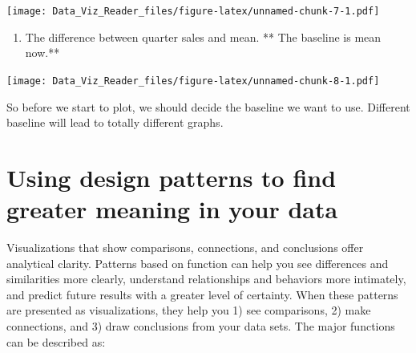 \documentclass[]{book}
\newenvironment{Shaded}{\begin{snugshade}}{\end{snugshade}}
\newcommand{\KeywordTok}[1]{\textcolor[rgb]{0.13,0.29,0.53}{\textbf{#1}}}
\newcommand{\DataTypeTok}[1]{\textcolor[rgb]{0.13,0.29,0.53}{#1}}
\newcommand{\DecValTok}[1]{\textcolor[rgb]{0.00,0.00,0.81}{#1}}
\newcommand{\StringTok}[1]{\textcolor[rgb]{0.31,0.60,0.02}{#1}}
\newcommand{\CommentTok}[1]{\textcolor[rgb]{0.56,0.35,0.01}{\textit{#1}}}
\newcommand{\OtherTok}[1]{\textcolor[rgb]{0.56,0.35,0.01}{#1}}
\newcommand{\ControlFlowTok}[1]{\textcolor[rgb]{0.13,0.29,0.53}{\textbf{#1}}}
\newcommand{\OperatorTok}[1]{\textcolor[rgb]{0.81,0.36,0.00}{\textbf{#1}}}
\newcommand{\NormalTok}[1]{#1}
\providecommand{\tightlist}{%
  \setlength{\itemsep}{0pt}\setlength{\parskip}{0pt}}
\theoremstyle{definition}
\theoremstyle{definition}
\theoremstyle{definition}
\theoremstyle{remark}
\begin{document}
\texttt{[image: Data\_Viz\_Reader\_files/figure-latex/unnamed-chunk-7-1.pdf]}

\begin{enumerate}
\def\labelenumi{\arabic{enumi}.}
\setcounter{enumi}{4}
\tightlist
\item
  The difference between quarter sales and mean. ** The baseline is mean
  now.**
\end{enumerate}

\begin{Shaded}
\end{Shaded}

\texttt{[image: Data\_Viz\_Reader\_files/figure-latex/unnamed-chunk-8-1.pdf]}

So before we start to plot, we should decide the baseline we want to
use. Different baseline will lead to totally different graphs.

\section{Using design patterns to find greater meaning in your
data}\label{using-design-patterns-to-find-greater-meaning-in-your-data}

Visualizations that show comparisons, connections, and conclusions offer
analytical clarity. Patterns based on function can help you see
differences and similarities more clearly, understand relationships and
behaviors more intimately, and predict future results with a greater
level of certainty. When these patterns are presented as visualizations,
they help you 1) see comparisons, 2) make connections, and 3) draw
conclusions from your data sets. The major functions can be described
as:
\end{document}
